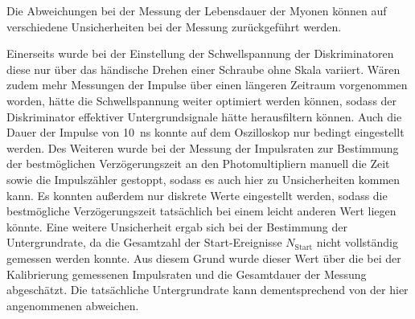 Die Abweichungen bei der Messung der Lebensdauer der Myonen können auf verschiedene Unsicherheiten bei der Messung zurückgeführt werden.

Einerseits wurde bei der Einstellung der Schwellspannung der Diskriminatoren diese nur über das händische Drehen einer Schraube ohne Skala variiert.
%
Wären zudem mehr Messungen der Impulse über einen längeren Zeitraum vorgenommen worden,
hätte die Schwellspannung weiter optimiert werden können,
sodass der Diskriminator effektiver Untergrundsignale hätte herausfiltern können.
%
Auch die Dauer der Impulse von \SI{10}{\nano\second} konnte auf dem Oszilloskop nur bedingt eingestellt werden.
%
Des Weiteren wurde bei der Messung der Impulsraten zur Bestimmung der bestmöglichen Verzögerungszeit an den Photomultipliern
manuell die Zeit sowie die Impulszähler gestoppt,
sodass es auch hier zu Unsicherheiten kommen kann.
%
Es konnten außerdem nur diskrete Werte eingestellt werden,
sodass die bestmögliche Verzögerungszeit tatsächlich bei einem leicht anderen Wert liegen könnte.
%
Eine weitere Unsicherheit ergab sich bei der Bestimmung der Untergrundrate,
da die Gesamtzahl der Start-Ereignisse $N_\text{Start}$ nicht vollständig gemessen werden konnte.
Aus diesem Grund wurde dieser Wert über die bei der Kalibrierung gemessenen Impulsraten und die Gesamtdauer der Messung abgeschätzt.
Die tatsächliche Untergrundrate kann dementsprechend von der hier angenommenen abweichen.



